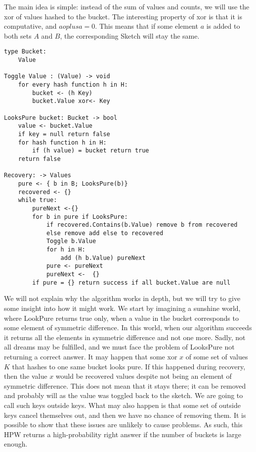 The main idea is simple: instead of the sum of values and counts, we will use the xor of values hashed to the bucket. The interesting property of xor is that it is computative, and $ aoplus a = 0$. This means that if some element $a$ is added to both sets $A$ and $B$, the corresponding Sketch will stay the same.

\begin{lstlisting}
type Bucket:
    Value

Toggle Value : (Value) -> void
    for every hash function h in H:
        bucket <- (h Key)
        bucket.Value xor<- Key

LooksPure bucket: Bucket -> bool
    value <- bucket.Value
    if key = null return false
    for hash function h in H:
        if (h value) = bucket return true
    return false
    
Recovery: -> Values
    pure <- { b in B; LooksPure(b)}
    recovered <- {}
    while true:
        pureNext <-{}
        for b in pure if LooksPure:
            if recovered.Contains(b.Value) remove b from recovered
            else remove add else to recovered
            Toggle b.Value
            for h in H:
                add (h b.Value) pureNext
            pure <- pureNext
            pureNext <-  {}
        if pure = {} return success if all bucket.Value are null
\end{lstlisting}
We will not explain why the algorithm works in depth, but we will try to give some insight into how it might work. We start by imagining a sunshine world, where LookPure returns true only, when a value in the bucket corresponds to some element of symmetric difference. In this world, when our algorithm succeeds it returns all the elements in symmetric difference and not one more. Sadly, not all dreams may be fulfilled, and we must face the problem of LooksPure not returning a correct answer.
It may happen that some xor $x$ of some set of values $K$ that hashes to one same bucket looks pure. If this happened during recovery, then the value $x$ would be recovered values despite not being an element of symmetric difference. This does not mean that it stays there; it can be removed and probably will as the value was toggled back to the sketch. We are going to call such keys outside keys. 
What may also happen is that some set of outside keys cancel themselves out, and then we have no chance of removing them.
It is possible to show that these issues are unlikely to cause problems. As such, this HPW returns a high-probability right answer if the number of buckets is large enough.